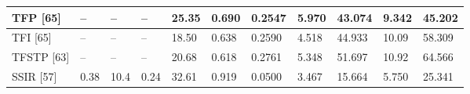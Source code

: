 \begin{tabular}{lllllllllll}
\toprule
TFP [65] & – & – & – & 25.35 & 0.690 & 0.2547 & 5.970 & 43.074 & 9.342 & 45.202 \\
\midrule
TFI [65] & – & – & – & 18.50 & 0.638 & 0.2590 & 4.518 & 44.933 & 10.09 & 58.309 \\
TFSTP [63] & – & – & – & 20.68 & 0.618 & 0.2761 & 5.348 & 51.697 & 10.92 & 64.566 \\
SSIR [57] & 0.38 & 10.4 & 0.24 & 32.61 & 0.919 & 0.0500 & 3.467 & 15.664 & 5.750 & 25.341 \\
\bottomrule
\end{tabular}
